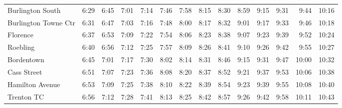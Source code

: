 \begin{center}
\begin{tabular}{@{}lrrrrrrrrrrrrr@{}}
Burlington South & 6:29 & 6:45 & 7:01 & 7:14 & 7:46 & 7:58 & 8:15 & 8:30 & 8:59 & 9:15 & 9:31 & 9:44 & 10:16 \\
Burlington Towne Ctr & 6:31 & 6:47 & 7:03 & 7:16 & 7:48 & 8:00 & 8:17 & 8:32 & 9:01 & 9:17 & 9:33 & 9:46 & 10:18 \\
Florence & 6:37 & 6:53 & 7:09 & 7:22 & 7:54 & 8:06 & 8:23 & 8:38 & 9:07 & 9:23 & 9:39 & 9:52 & 10:24 \\
Roebling & 6:40 & 6:56 & 7:12 & 7:25 & 7:57 & 8:09 & 8:26 & 8:41 & 9:10 & 9:26 & 9:42 & 9:55 & 10:27 \\
Bordentown & 6:45 & 7:01 & 7:17 & 7:30 & 8:02 & 8:14 & 8:31 & 8:46 & 9:15 & 9:31 & 9:47 & 10:00 & 10:32 \\
Cass Street & 6:51 & 7:07 & 7:23 & 7:36 & 8:08 & 8:20 & 8:37 & 8:52 & 9:21 & 9:37 & 9:53 & 10:06 & 10:38 \\
Hamilton Avenue & 6:53 & 7:09 & 7:25 & 7:38 & 8:10 & 8:22 & 8:39 & 8:54 & 9:23 & 9:39 & 9:55 & 10:08 & 10:40 \\
Trenton TC & 6:56 & 7:12 & 7:28 & 7:41 & 8:13 & 8:25 & 8:42 & 8:57 & 9:26 & 9:42 & 9:58 & 10:11 & 10:43 \\
\bottomrule\end{tabular}\end{center}
